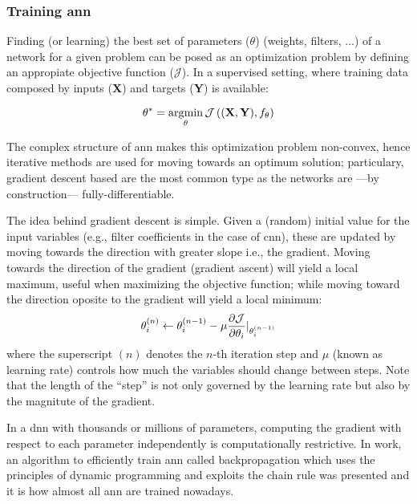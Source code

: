 \documentclass[../main.tex]{subfiles}
\begin{document}
\subsubsection{Training \gls{ann}}\label{sec:optimizers}
Finding (or learning) the best set of parameters ($\theta$) (weights, filters,
...) of a network for a given problem can be posed as an optimization problem by
defining an appropiate objective function ($\mathcal{J}$).
In a supervised setting, where training data composed by
inputs (\textbf{X}) and targets (\textbf{Y}) is available:

\begin{equation}
\theta^* = \operatorname*{arg\!\min}_{\theta} \mathcal{J}
\left( (\mathbf{X}, \mathbf{Y}), f_{\theta} \right)
\end{equation}

The complex structure of \gls{ann} makes this optimization problem non-convex,
hence iterative methods are used for moving towards an optimum solution;
particulary, gradient descent based are the most common type as the networks
are ---by construction--- fully-differentiable.

The idea behind gradient descent is simple. Given a (random) initial value
for the input variables (e.g., filter coefficients in the case of \gls{cnn}),
these are updated by moving towards the direction with greater slope
i.e., the gradient. Moving towards the direction of the gradient (gradient
ascent) will yield a local maximum, useful when maximizing the objective
function; while moving toward the direction oposite to the gradient will
yield a local minimum:
\begin{equation}\label{eq:gradient-descent}
\theta_i^{(n)} \leftarrow \theta_i^{(n - 1)}
- \mu \frac{\partial \mathcal{J}}{\partial \theta_i}
\rvert_{\theta_i^{(n - 1)}}
\end{equation}
where the superscript $(n)$ denotes the $n$-th iteration step and $\mu$
(known as learning rate) controls how much the variables should change between
steps. Note that the length of the ``step'' is not only governed by the
learning rate but also by the magnitute of the gradient.

In a \gls{dnn} with thousands or millions of parameters, computing the gradient
with respect to each parameter independently is computationally restrictive.
In \cite{backprop} work, an algorithm to efficiently train \gls{ann}
called backpropagation\footnotemark{}  which uses the principles of dynamic
programming and exploits the chain rule was presented and it is how almost
all \gls{ann} are trained nowadays.
\end{document}
